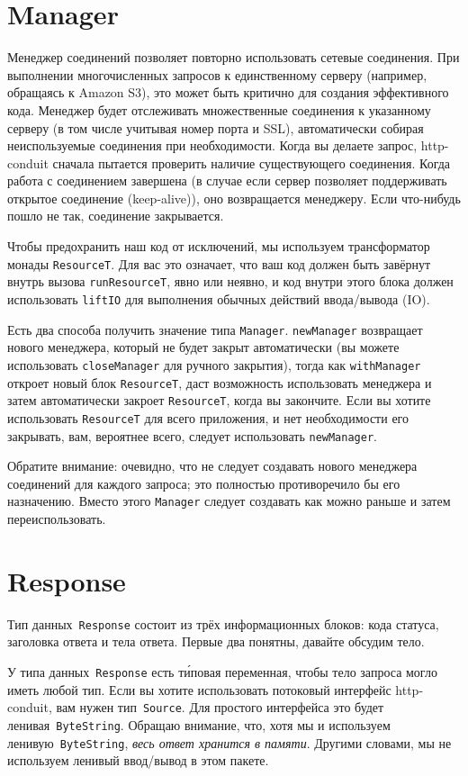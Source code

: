 \section{Manager}
Менеджер соединений позволяет повторно использовать сетевые соединения. При
выполнении многочисленных запросов к единственному серверу (например, обращаясь
к Amazon S3), это может быть критично для создания эффективного кода. Менеджер
будет отслеживать множественные соединения к указанному серверу (в том числе
учитывая номер порта и SSL), автоматически собирая неиспользуемые соединения
при необходимости. Когда вы делаете запрос, http-conduit сначала пытается
проверить наличие существующего соединения. Когда работа с соединением
завершена (в случае если сервер позволяет поддерживать открытое соединение
(keep-alive)), оно возвращается менеджеру. Если что-нибудь пошло не так,
соединение закрывается.

Чтобы предохранить наш код от исключений, мы используем трансформатор монады
\lstinline!ResourceT!. Для вас это означает, что ваш код должен быть завёрнут
внутрь вызова \lstinline!runResourceT!, явно или неявно, и код внутри этого
блока должен использовать \lstinline!liftIO! для выполнения обычных действий
ввода/вывода (IO).

Есть два способа получить значение типа \lstinline!Manager!.
\lstinline!newManager! возвращает нового менеджера, который не будет закрыт
автоматически (вы можете использовать \lstinline!closeManager! для ручного
закрытия), тогда как \lstinline!withManager! откроет новый блок
\lstinline!ResourceT!, даст возможность использовать менеджера и затем
автоматически закроет \lstinline!ResourceT!, когда вы закончите. Если вы хотите
использовать \lstinline!ResourceT! для всего приложения, и нет необходимости
его закрывать, вам, вероятнее всего, следует использовать
\lstinline!newManager!.

Обратите внимание: очевидно, что не следует создавать нового менеджера
соединений для каждого запроса; это полностью противоречило бы его назначению.
Вместо этого \lstinline!Manager! следует создавать как можно раньше и затем
переиспользовать.

\section{Response}
Тип данных~\lstinline!Response! состоит из трёх информационных блоков: кода
статуса, заголовка ответа и тела ответа. Первые два понятны, давайте обсудим
тело.

У типа данных~\lstinline!Response! есть т\'иповая переменная, чтобы тело
запроса могло иметь любой тип. Если вы хотите использовать потоковый интерфейс
http-conduit, вам нужен тип~\lstinline!Source!. Для простого интерфейса это
будет ленивая~\lstinline!ByteString!. Обращаю внимание, что, хотя мы и
используем ленивую~\lstinline!ByteString!, \emph{весь ответ хранится в памяти}.
Другими словами, мы не используем ленивый ввод/вывод в этом пакете.

